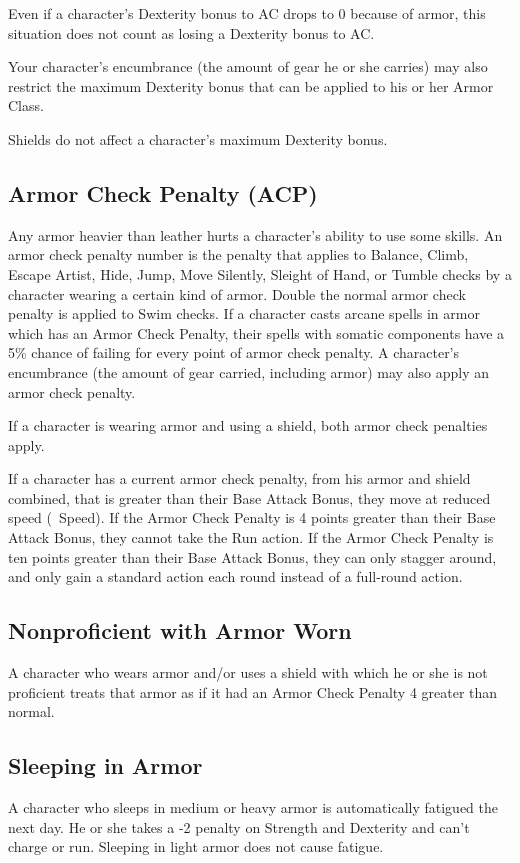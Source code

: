Even if a character's Dexterity bonus to AC drops to 0 because of armor, this situation does not count as losing a Dexterity bonus to AC.

Your character's encumbrance (the amount of gear he or she carries) may also restrict the maximum Dexterity bonus that can be applied to his or her Armor Class.

Shields do not affect a character's maximum Dexterity bonus.

\subsection{Armor Check Penalty (ACP)}
Any armor heavier than leather hurts a character's ability to use some skills. An armor check penalty number is the penalty that applies to Balance, Climb, Escape Artist, Hide, Jump, Move Silently, Sleight of Hand, or Tumble checks by a character wearing a certain kind of armor. Double the normal armor check penalty is applied to Swim checks. If a character casts arcane spells in armor which has an Armor Check Penalty, their spells with somatic components have a 5\% chance of failing for every point of armor check penalty. A character's encumbrance (the amount of gear carried, including armor) may also apply an armor check penalty.

If a character is wearing armor and using a shield, both armor check penalties apply.

If a character has a current armor check penalty, from his armor and shield combined, that is greater than their Base Attack Bonus, they move at reduced speed (~Speed). If the Armor Check Penalty is 4 points greater than their Base Attack Bonus, they cannot take the Run action. If the Armor Check Penalty is ten points greater than their Base Attack Bonus, they can only stagger around, and only gain a standard action each round instead of a full-round action.

\subsection{Nonproficient with Armor Worn}
A character who wears armor and/or uses a shield with which he or she is not proficient treats that armor as if it had an Armor Check Penalty 4 greater than normal.

\subsection{Sleeping in Armor}
A character who sleeps in medium or heavy armor is automatically fatigued the next day. He or she takes a -2 penalty on Strength and Dexterity and can't charge or run. Sleeping in light armor does not cause fatigue.

